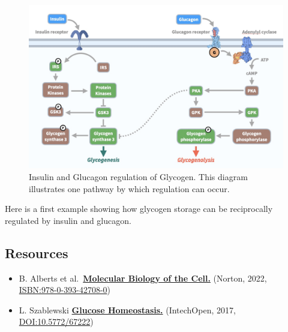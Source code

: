 \documentclass[]{tufte-handout}
\providecommand{\tightlist}{%
  \setlength{\itemsep}{0pt}\setlength{\parskip}{0pt}}
\begin{document}
\begin{figure}

{\centering \includegraphics{img/insulin_glucagon_pathways} 

}

\caption[Insulin and Glucagon regulation of Glycogen]{Insulin and Glucagon regulation of Glycogen. This diagram illustrates one pathway by which regulation can occur.}\label{fig:unnamed-chunk-5}
\end{figure}

Here is a first example showing how glycogen storage can be reciprocally regulated by insulin and glucagon.

\subsection{Resources}\label{resources}

\begin{itemize}
\tightlist
\item
  B. Alberts et al.~\textbf{\href{https://wwnorton.com/books/9780393884821/about-the-book/product-details}{Molecular Biology of the Cell.}} (Norton, 2022, \url{ISBN:978-0-393-42708-0})
\item
  L. Szablewski \textbf{\href{https://doi.org/10.5772/67222}{Glucose Homeostasis.}} (IntechOpen, 2017, \url{DOI:10.5772/67222})
\end{itemize}
\end{document}
